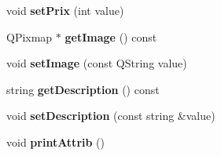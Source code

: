 \begin{DoxyCompactItemize}
\item 
void {\bfseries set\+Prix} (int value)\hypertarget{classplat_a7e93c36df32773e7795b53ed1cf33858}{}\label{classplat_a7e93c36df32773e7795b53ed1cf33858}

\item 
Q\+Pixmap $\ast$ {\bfseries get\+Image} () const \hypertarget{classplat_a31232ed48766ff638057afc0ffe95ee2}{}\label{classplat_a31232ed48766ff638057afc0ffe95ee2}

\item 
void {\bfseries set\+Image} (const Q\+String value)\hypertarget{classplat_ac5862c8bf2fe8cad875246f32552af33}{}\label{classplat_ac5862c8bf2fe8cad875246f32552af33}

\item 
string {\bfseries get\+Description} () const \hypertarget{classplat_afc604b710f40dc9a883b2ee7744b5fdc}{}\label{classplat_afc604b710f40dc9a883b2ee7744b5fdc}

\item 
void {\bfseries set\+Description} (const string \&value)\hypertarget{classplat_a3e68a4e2b479609ea310210960beae6f}{}\label{classplat_a3e68a4e2b479609ea310210960beae6f}

\item 
void {\bfseries print\+Attrib} ()\hypertarget{classplat_a65ef0271840d18f29bf409b929a75b7f}{}\label{classplat_a65ef0271840d18f29bf409b929a75b7f}

\end{DoxyCompactItemize}
